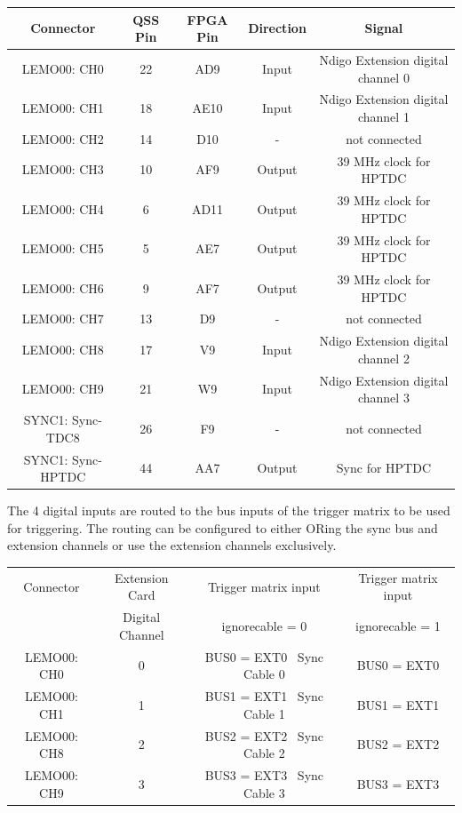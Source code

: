 	\begin{small}
	\begin{center}
		\begin{tabular}{|c|c|c|c|c|}
			\hline
			Connector & QSS Pin & FPGA Pin & Direction & Signal\\
			\hline\hline
			LEMO00: CH0 & 22 & AD9 & Input & Ndigo Extension digital channel 0\\\hline
			LEMO00: CH1 & 18 & AE10 & Input & Ndigo Extension digital channel 1\\\hline
			LEMO00: CH2 & 14 & D10 & - & not connected\\\hline
			LEMO00: CH3 & 10 & AF9 & Output & 39 MHz clock for HPTDC\\\hline
			LEMO00: CH4 & 6 & AD11 & Output & 39 MHz clock for HPTDC\\\hline
			LEMO00: CH5 & 5 & AE7 & Output & 39 MHz clock for HPTDC\\\hline
			LEMO00: CH6 & 9 & AF7 & Output & 39 MHz clock for HPTDC\\\hline
			LEMO00: CH7 & 13 & D9 & - & not connected\\\hline
			LEMO00: CH8 & 17 & V9 & Input & Ndigo Extension digital channel 2\\\hline
			LEMO00: CH9 & 21 & W9 & Input & Ndigo Extension digital channel 3\\\hline
			SYNC1: Sync-TDC8 & 26 & F9 & - & not connected\\\hline
			SYNC1: Sync-HPTDC & 44 & AA7 & Output & Sync for HPTDC\\\hline
		\end{tabular}
	\end{center}
	\end{small}
	
	The 4 digital inputs are routed to the bus inputs of the trigger matrix to be used for triggering. The routing can be configured to either ORing the sync bus and extension channels or use the extension channels exclusively.

	\begin{center}
		\begin{tabular}{|c|c|c|c|}
			\hline
			Connector & Extension Card & Trigger matrix input  & Trigger matrix input\\
			& Digital Channel & ignore\textunderscore cable = 0 & ignore\textunderscore cable = 1\\
			\hline\hline
			LEMO00: CH0 & 0 & BUS0 = EXT0 \textbar\ Sync Cable 0 & BUS0 = EXT0\\\hline
			LEMO00: CH1 & 1 & BUS1 = EXT1 \textbar\ Sync Cable 1 & BUS1 = EXT1\\\hline
			LEMO00: CH8 & 2 & BUS2 = EXT2 \textbar\ Sync Cable 2 & BUS2 = EXT2\\\hline
			LEMO00: CH9 & 3 & BUS3 = EXT3 \textbar\ Sync Cable 3 & BUS3 = EXT3\\\hline
		\end{tabular}
	\end{center}

